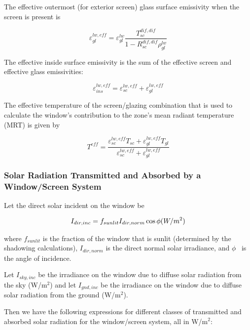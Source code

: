 The effective outermost (for exterior screen) glass surface emissivity when the screen is present is

\begin{equation}
\varepsilon_{gl}^{lw,eff} = \varepsilon_{gl}^{lw}\frac{{T_{sc}^{dif,dif}}}{{1 - R_{sc}^{dif,dif}\rho_{gl}^{lw}}}
\end{equation}

The effective inside surface emissivity is the sum of the effective screen and effective glass emissivities:

\begin{equation}
\varepsilon_{ins}^{lw,eff} = \varepsilon_{sc}^{lw,eff} + \varepsilon_{gl}^{lw,eff}
\end{equation}

The effective temperature of the screen/glazing combination that is used to calculate the window's contribution to the zone's mean radiant temperature (MRT) is given by

\begin{equation}
{T^{eff}} = \frac{{\varepsilon_{sc}^{lw,eff}{T_{sc}} + \varepsilon_{gl}^{lw,eff}{T_{gl}}}}{{\varepsilon_{sc}^{lw,eff} + \varepsilon_{gl}^{lw,eff}}}
\end{equation}

\subsubsection{Solar Radiation Transmitted and Absorbed by a Window/Screen System}\label{solar-radiation-transmitted-and-absorbed-by-a-windowscreen-system}

Let the direct solar incident on the window be

\begin{equation}
{I_{dir,inc}} = {f_{sunlit}}{I_{dir,norm}}\cos \phi {\rm{    }}(W/{m^2})
\end{equation}

where \({f_{sunlit}}\) is the fraction of the window that is sunlit (determined by the shadowing calculations), \({I_{dir,norm}}\) is the direct normal solar irradiance, and \(\phi\) ~is the angle of incidence.

Let \({I_{sky,inc}}\) be the irradiance on the window due to diffuse solar radiation from the sky (W/m\(^{2}\)) and let \({I_{gnd,inc}}\) be the irradiance on the window due to diffuse solar radiation from the ground (W/m\(^{2}\)).

Then we have the following expressions for different classes of transmitted and absorbed solar radiation for the window/screen system, all in W/m\(^{2}\):

